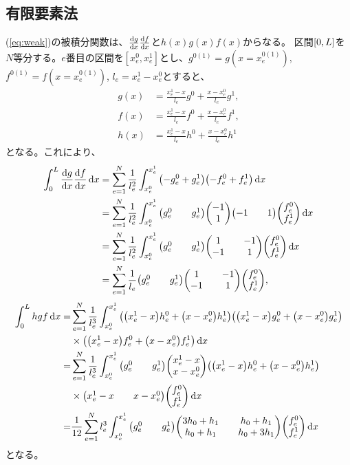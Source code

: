 \documentclass[xelatex,ja=standard]{bxjsarticle}
\begin{document}
\subsection{有限要素法}
(\ref{eq:weak})の被積分関数は、$\dv{g}{x}\dv{f}{x}$と$h(x)g(x)f(x)$からなる。
区間$\qty[0,L]$を$N$等分する。$e$番目の区間を$[x_e^0,x_e^1]$とし、$g^{0(1)} = g(x=x_e^{0(1)})$, $f^{0(1)} = f(x=x_e^{0(1)})$, $l_e = x_e^1 - x_e^0$とすると、
\begin{align}
    g(x) &= \frac{x_e^1 - x}{l_e}g^0 + \frac{x-x_e^0}{l_e}g^1,\\
    f(x) &= \frac{x_e^1 - x}{l_e}f^0 + \frac{x-x_e^0}{l_e}f^1,\\
    h(x) &= \frac{x_e^1 - x}{l_e}h^0 + \frac{x-x_e^0}{l_e}h^1
\end{align}
となる。これにより、
\begin{align}
    \int_0^L \dv{g}{x}\dv{f}{x}\dd{x} 
    &= \sum_{e=1}^N \frac{1}{l_e^2}\int_{x_e^0}^{x_e^1}\qty(-g_e^0 + g_e^1)\qty(-f_e^0 + f_e^1)\dd{x}\notag\\
    &= \sum_{e=1}^N \frac{1}{l_e^2}\int_{x_e^0}^{x_e^1}\mqty(g_e^0 && g_e^1)\mqty(-1\\1)\mqty(-1 && 1)\mqty(f_e^0 \\ f_e^1)\dd{x}\notag\\
    &= \sum_{e=1}^N \frac{1}{l_e^2}\int_{x_e^0}^{x_e^1}\mqty(g_e^0 && g_e^1)\mqty(1 && -1 \\ -1 && 1)\mqty(f_e^0 \\ f_e^1)\dd{x}\notag\\
    &= \sum_{e=1}^N \frac{1}{l_e}\mqty(g_e^0 && g_e^1)\mqty(1 && -1 \\ -1 && 1)\mqty(f_e^0 \\ f_e^1),
\end{align}
\begin{align}
    \int_0^L hgf\dd{x}
    =& \sum_{e=1}^N \frac{1}{l_e^3}\int_{x_e^0}^{x_e^1}
    \qty(\qty(x_e^1 - x)h_e^0 + \qty(x-x_e^0)h_e^1)
    \qty(\qty(x_e^1 - x)g_e^0 + \qty(x-x_e^0)g_e^1)\notag\\
    &\times\qty(\qty(x_e^1 - x)f_e^0 + \qty(x-x_e^0)f_e^1)
    \dd{x}\notag\\
    =& \sum_{e=1}^N \frac{1}{l_e^3}\int_{x_e^0}^{x_e^1}
    \mqty(g_e^0 && g_e^1) \mqty(x_e^1 - x \\ x-x_e^0)
    \qty(\qty(x_e^1 - x)h_e^0 + \qty(x-x_e^0)h_e^1)\notag\\
    &\times\mqty(x_e^1 - x && x-x_e^0)\mqty(f_e^0 \\ f_e^1)
    \dd{x}\notag\\
    =& \frac{1}{12}\sum_{e=1}^N l_e^3\int_{x_e^0}^{x_e^1}
    \mqty(g_e^0 && g_e^1) \mqty(3h_0 +h_1 && h_0 +h_1\\ h_0 +h_1&&h_0 +3h_1)\mqty(f_e^0 \\ f_e^1)
    \dd{x}\notag\\
\end{align}
となる。
\end{document}
